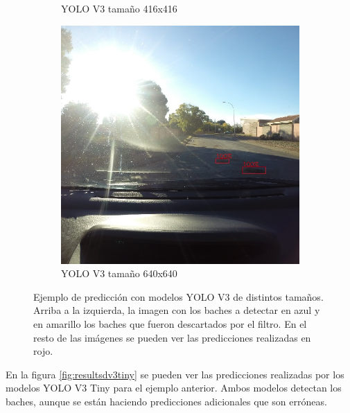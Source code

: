 \begin{figure}[H]
\begin{subfigure}[h]{0.45\linewidth}
		\caption{YOLO V3 tamaño 416x416}
	\end{subfigure}
	\begin{subfigure}[h]{0.45\linewidth}
		\includegraphics[width=\linewidth]{images/results_d_yolo_v3_640.jpg}
		\caption{YOLO V3 tamaño 640x640}
	\end{subfigure}
	\caption{Ejemplo de predicción con modelos YOLO V3 de distintos tamaños. Arriba a la izquierda, la imagen con los baches a detectar en azul y en amarillo los baches que fueron descartados por el filtro. En el resto de las imágenes se pueden ver las predicciones realizadas en rojo.}
	\label{fig:resultsdv3}
\end{figure}

En la figura \ref{fig:resultsdv3tiny} se pueden ver las predicciones realizadas por los modelos YOLO V3 Tiny para el ejemplo anterior. Ambos modelos detectan los baches, aunque se están haciendo predicciones adicionales que son erróneas.

